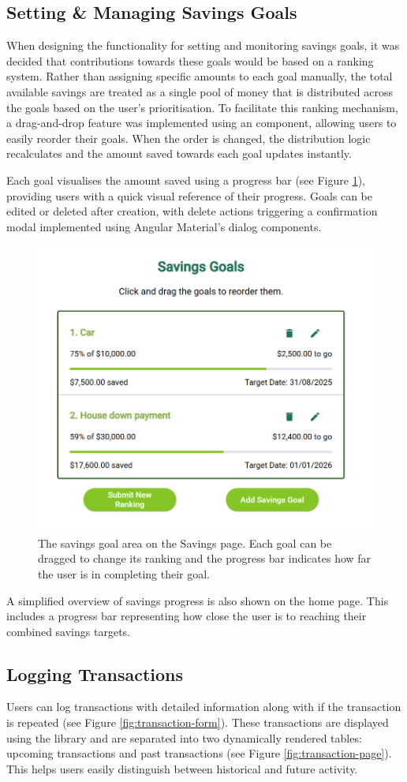 \documentclass{l4proj}
\begin{document}
\subsection{Setting \& Managing Savings Goals}
When designing the functionality for setting and monitoring savings goals, it was decided that contributions towards these goals would be based on a ranking system. Rather than assigning specific amounts to each goal manually, the total available savings are treated as a single pool of money that is distributed across the goals based on the user’s prioritisation. To facilitate this ranking mechanism, a drag-and-drop feature was implemented using an \citet{angular_material} component, allowing users to easily reorder their goals. When the order is changed, the distribution logic recalculates and the amount saved towards each goal updates instantly.

Each goal visualises the amount saved using a progress bar (see Figure \ref{fig:savings-area}), providing users with a quick visual reference of their progress. Goals can be edited or deleted after creation, with delete actions triggering a confirmation modal implemented using Angular Material’s dialog components.

\begin{figure}[htb]
    \centering
    \includegraphics[width=0.35\linewidth]{images/UI-Screenshots/savings-goals-area.png}
    \caption{The savings goal area on the Savings page. Each goal can be dragged to change its ranking and the progress bar indicates how far the user is in completing their goal.}
    \label{fig:savings-area}
\end{figure}

A simplified overview of savings progress is also shown on the home page. This includes a progress bar representing how close the user is to reaching their combined savings targets.

\subsection{Logging Transactions}
Users can log transactions with detailed information along with if the transaction is repeated (see Figure \ref{fig:transaction-form}). These transactions are displayed using the \citet{ag_grid} library and are separated into two dynamically rendered tables: upcoming transactions and past transactions (see Figure \ref{fig:transaction-page}). This helps users easily distinguish between historical and future activity.
\end{document}
